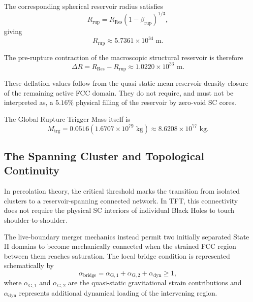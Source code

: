 The corresponding spherical reservoir radius satisfies
\begin{equation}
    R_{\mathrm{rup}}
    =
    R_{\mathrm{Res}}
    (1-\beta_{\mathrm{rup}})^{1/3},
\end{equation}
giving
\begin{equation}
    R_{\mathrm{rup}}
    \approx
    5.7361\times10^{34}
    \text{ m}.
\end{equation}

The pre-rupture contraction of the macroscopic structural reservoir is therefore
\begin{equation}
    \Delta R
    =
    R_{\mathrm{Res}}-R_{\mathrm{rup}}
    \approx
    1.0220\times10^{33}
    \text{ m}.
\end{equation}

These deflation values follow from the quasi-static mean-reservoir-density closure of the remaining active FCC domain. They do not require, and must not be interpreted as, a $5.16\%$ physical filling of the reservoir by zero-void SC cores.

The Global Rupture Trigger Mass itself is
\begin{equation}
    M_{\mathrm{trg}}
    =
    0.0516
    \left(
        1.6707\times10^{79}
        \text{ kg}
    \right)
    \approx
    8.6208\times10^{77}
    \text{ kg}.
\end{equation}

\subsection{The Spanning Cluster and Topological Continuity}

In percolation theory, the critical threshold marks the transition from isolated clusters to a reservoir-spanning connected network. In TFT, this connectivity does not require the physical SC interiors of individual Black Holes to touch shoulder-to-shoulder.

The live-boundary merger mechanics instead permit two initially separated State II domains to become mechanically connected when the strained FCC region between them reaches saturation. The local bridge condition is represented schematically by
\begin{equation}
    \alpha_{\mathrm{bridge}}
    =
    \alpha_{\mathrm{G},1}
    +
    \alpha_{\mathrm{G},2}
    +
    \alpha_{\mathrm{dyn}}
    \geq
    1,
\end{equation}
where $\alpha_{\mathrm{G},1}$ and $\alpha_{\mathrm{G},2}$ are the quasi-static gravitational strain contributions and $\alpha_{\mathrm{dyn}}$ represents additional dynamical loading of the intervening region.

